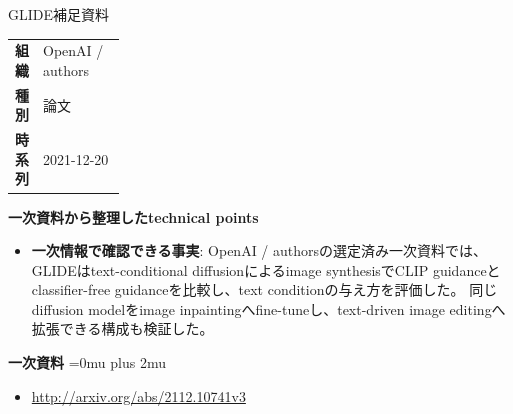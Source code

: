 \begin{technicalnote}{GLIDE}{補足資料}
\begingroup
\begin{tabularx}{\linewidth}{@{}>{\bfseries}p{0.22\linewidth}X@{}}
組織 & OpenAI / authors \\
種別 & 論文 \\
時系列 & 2021-12-20 \\
\end{tabularx}
\smallskip
{\bfseries 一次資料から整理したtechnical points}
\begin{itemize}[leftmargin=1.5em,itemsep=0.35em]
\item \textbf{一次情報で確認できる事実}: OpenAI / authorsの選定済み一次資料では、GLIDEはtext-conditional diffusionによるimage synthesisでCLIP guidanceとclassifier-free guidanceを比較し、text conditionの与え方を評価した。 同じdiffusion modelをimage inpaintingへfine-tuneし、text-driven image editingへ拡張できる構成も検証した。
\end{itemize}
\begin{minipage}{\linewidth}
\begin{samepage}
{\bfseries 一次資料}
\begingroup\sloppy
\Urlmuskip=0mu plus 2mu\relax
\begin{itemize}[leftmargin=1.5em,itemsep=0.25em]
\item {\scriptsize\url{http://arxiv.org/abs/2112.10741v3}}
\end{itemize}
\endgroup
\end{samepage}
\end{minipage}
\endgroup
\end{technicalnote}
\medskip

